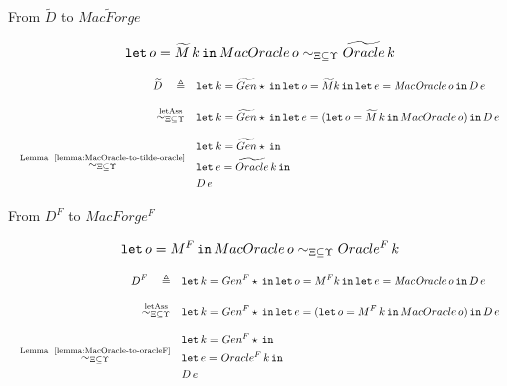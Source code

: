 \documentclass{beamer}[aspectratio=169]
\begin{document}
\begin{frame}{From \texorpdfstring{$\widetilde{D}$}{MacOracle} to \texorpdfstring{$\widetilde{MacForge}$}{MacForge}}
\begin{lemma}\label{lemma:MacOracle-to-tilde-oracle}
\[ \mathtt{let}\,o=\widetilde{M}\,k\,\mathtt{in}\, MacOracle\,o \sim_{\Xi\subseteq\Upsilon} \widetilde{Oracle}\,k \]
\end{lemma}

\footnotesize
\begin{align*}
    \widetilde{D}\quad\triangleq\quad& \mathtt{let}\,k=\widetilde{Gen} \star\,\mathtt{in}\, \mathtt{let}\,o=\widetilde{M} k\,\mathtt{in}\, \mathtt{let}\,e=\mathit{MacOracle}\,o\,\mathtt{in}\, D\,e      
    \\[2ex]
    \quad \overset{\text{letAss}}{\sim_{\Xi\subseteq\Upsilon}}\quad&
    \begin{aligned}
        &\mathtt{let}\,k=\widetilde{Gen} \star\,\mathtt{in}\, \mathtt{let}\,e=(\mathtt{let}\,o=\widetilde{M}\,k\,\mathtt{in}\, MacOracle\,o)\,\mathtt{in}\, D\,e
    \end{aligned}
    \\[2ex]
    \quad \overset{\text{Lemma ~\ref{lemma:MacOracle-to-tilde-oracle}}} {\sim_{\Xi\subseteq\Upsilon}} \quad&
    \begin{aligned}
        &\mathtt{let}\,k=\widetilde{Gen}\star\,\mathtt{in}\, \\&\mathtt{let}\,e=\widetilde{Oracle}\,k\,\mathtt{in}\, 
        \\&{D\,e}
    \end{aligned}
\end{align*}
\end{frame}

\begin{frame}{From \texorpdfstring{$D^F$}{D} to \texorpdfstring{$MacForge^F$}{MacForge}}
    \begin{lemma}\label{lemma:MacOracle-to-oracleF}
    \[ \mathtt{let}\,o=M^F\,\mathtt{in}\, MacOracle\,o\sim_{\Xi\subseteq\Upsilon} Oracle^F\,k \]
    \end{lemma}
    \footnotesize
    \begin{align*}
        D^F \quad\triangleq\quad& \mathtt{let}\,k=Gen^F \star\,\mathtt{in}\, \mathtt{let}\,o=M^F k\,\mathtt{in}\, \mathtt{let}\,e=\mathit{MacOracle}\,o\,\mathtt{in}\, D\,e
    \\[2ex]
    \quad\overset{\text{letAss}}{\sim_{\Xi\subseteq\Upsilon}}\quad&
    \begin{aligned}
        &\mathtt{let}\,k=Gen^F \star\,\mathtt{in}\, \mathtt{let}\,e=(\mathtt{let}\,o=M^F\,k\,\mathtt{in}\, MacOracle\,o)\,\mathtt{in}\, D\,e
    \end{aligned}
    \\[2ex]
     \quad\overset{\text{Lemma ~\ref{lemma:MacOracle-to-oracleF}}}{\sim_{\Xi\subseteq\Upsilon}}\quad&
    \begin{aligned} 
        &\mathtt{let}\,k=Gen^F \star\,\mathtt{in}\, \\
        &\mathtt{let}\,e=Oracle^F\,k\,\mathtt{in}\, \\
        &{D\,e}
    \end{aligned}
    \end{align*}
\end{frame}
\end{document}
